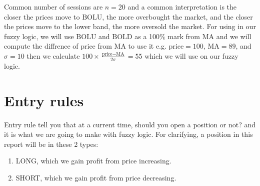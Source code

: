 \documentclass{article}
\begin{document}
Common number of sessions are $n = 20$ and a common interpretation is the closer the prices move to $\text{BOLU}$, 
the more overbought the market, and the closer the prices move to the lower band, the more oversold the market.
For using in our fuzzy logic, we will use $\text{BOLU}$ and $\text{BOLD}$ as a 100\% mark from $\text{MA}$ and we will
compute the diffrence of price from $\text{MA}$ to use it e.g. $\text{price} = 100$, $\text{MA} = 89$, and $\sigma = 10$
then we calculate $100 \times \frac{\text{price} - \text{MA}}{2\sigma} = 55$ which we will use on our fuzzy logic.  

\section*{Entry rules}
Entry rule tell you that at a current time, should you open a position or not? and it is what we are going to make with fuzzy logic.
For clarifying, a position in this report will be in these 2 types:
\begin{enumerate}
    \item LONG, which we gain profit from price increasing.
    \item SHORT, which we gain profit from price decreasing.
\end{enumerate}
\end{document}
